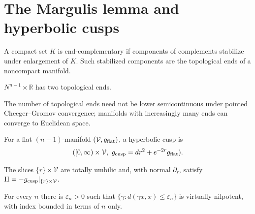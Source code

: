 \section{The Margulis lemma and hyperbolic cusps}

\begin{definition}
\label{def:chow-iv-topological-end}
A compact set \(K\) is end-complementary if components of complements stabilize
under enlargement of \(K\).  Such stabilized components are the topological
ends of a noncompact manifold.
\end{definition}

\begin{example}[Cylinder]
\label{ex:chow-iv-cylinder-ends}
\(N^{n-1}\times\mathbb R\) has two topological ends.
\end{example}

\begin{claim}
\label{ex:chow-iv-ends-cheeger-gromov}
The number of topological ends need not be lower semicontinuous under pointed
Cheeger--Gromov convergence; manifolds with increasingly many ends can converge
to Euclidean space.
\end{claim}

\begin{definition}
\label{def:chow-iv-hyperbolic-cusp}
For a flat \((n-1)\)-manifold \((\mathcal V,g_{\rm flat})\), a hyperbolic cusp is
\[
([0,\infty)\times\mathcal V,\ g_{\rm cusp}=dr^2+e^{-2r}g_{\rm flat}).
\]
\end{definition}

\begin{claim}
\label{ex:chow-iv-cusp-slices-umbilic}
The slices \(\{r\}\times\mathcal V\) are totally umbilic and, with normal
\(\partial_r\), satisfy \(\mathrm{II}=-g_{\rm cusp}|_{\{r\}\times\mathcal V}\).
\end{claim}

\begin{theorem}
\label{thm:chow-iv-margulis-algebraic}
For every \(n\) there is \(\varepsilon_n>0\) such that
\(\{\gamma:d(\gamma x,x)\le\varepsilon_n\}\) is virtually nilpotent, with
index bounded in terms of \(n\) only.
\end{theorem}

